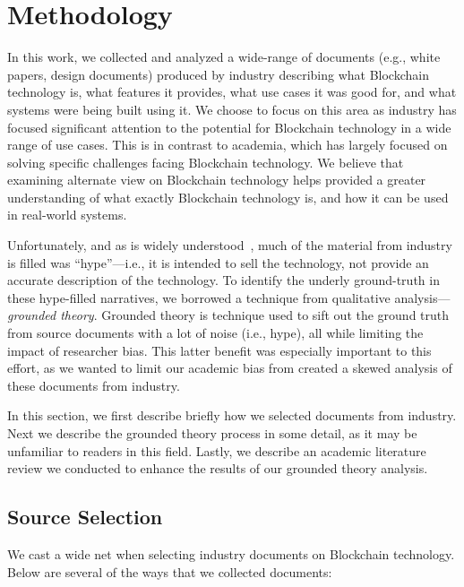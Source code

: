 
\section{Methodology}

In this work, we collected and analyzed a wide-range of documents (e.g., white papers, design documents) produced by industry describing what Blockchain technology is, what features it provides, what use cases it was good for, and what systems were being built using it.
We choose to focus on this area as industry has focused significant attention to the potential for Blockchain technology in a wide range of use cases.
This is in contrast to academia, which has largely focused on solving specific challenges facing Blockchain technology.
We believe that examining alternate view on Blockchain technology helps provided a greater understanding of what exactly Blockchain technology is, and how it can be used in real-world systems.

Unfortunately, and as is widely understood~\cite{garnetHypeStuff}, much of the material from industry is filled was ``hype''---i.e., it is intended to sell the technology, not provide an accurate description of the technology.
To identify the underly ground-truth in these hype-filled narratives, we borrowed a technique from qualitative analysis---\textit{grounded theory}.
Grounded theory is technique used to sift out the ground truth from source documents with a lot of noise (i.e., hype), all while limiting the impact of researcher bias.
This latter benefit was especially important to this effort, as we wanted to limit our academic bias from created a skewed analysis of these documents from industry.

In this section, we first describe briefly how we selected documents from industry.
Next we describe the grounded theory process in some detail, as it may be unfamiliar to readers in this field.
Lastly, we describe an academic literature review we conducted to enhance the results of our grounded theory analysis.

\subsection{Source Selection}
We cast a wide net when selecting industry documents on Blockchain technology.
Below are several of the ways that we collected documents:



